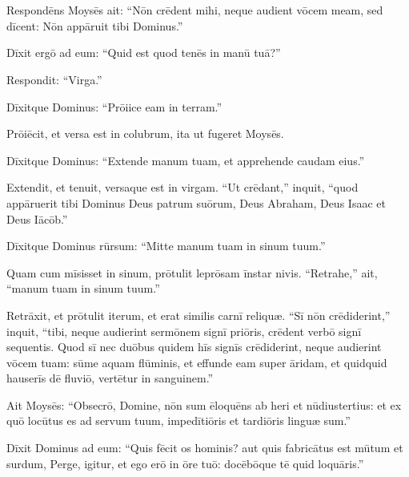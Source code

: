\chapter{}

\thispagestyle{empty}

\vspace*{-1.0cm}

Respondēns Moysēs ait: ``Nōn crēdent mihi, neque audient vōcem meam, sed dīcent:
Nōn appāruit tibi Dominus.''

Dīxit ergō ad eum: ``Quid est quod tenēs in manū tuā?''

Respondit: ``Virga.''

Dīxitque Dominus: ``Prōiice eam in terram.''

Prōiēcit, et versa est in colubrum, ita ut fugeret Moysēs. 

Dīxitque Dominus: ``Extende manum tuam, et apprehende caudam eius.''

Extendit, et tenuit, versaque est in virgam.
``Ut crēdant,'' inquit, ``quod appāruerit tibi Dominus Deus patrum suōrum,
Deus Abraham, Deus Isaac et Deus Iācōb.''

Dīxitque Dominus rūrsum: ``Mitte manum tuam in sinum tuum.''

Quam cum mīsisset in sinum, prōtulit leprōsam īnstar nivis.
 ``Retrahe,'' ait, ``manum tuam in sinum tuum.''

Retrāxit, et prōtulit iterum,
et erat similis carnī reliquæ.
``Sī nōn crēdiderint,'' inquit, ``tibi, neque audierint
sermōnem signī priōris, crēdent verbō signī sequentis. 
Quod sī nec duōbus quidem hīs signīs crēdiderint,
neque audierint vōcem tuam: sūme aquam flūminis,
et effunde eam super āridam, et quidquid hauserīs dē fluviō,
vertētur in sanguinem.''


Ait Moysēs: ``Obsecrō, Domine, nōn sum ēloquēns ab heri et
nūdiustertius: et ex quō locūtus es ad servum tuum,
impedītiōris et tardiōris linguæ sum.''

Dīxit Dominus ad eum: ``Quis fēcit os hominis?
aut quis fabricātus est mūtum et surdum,
Perge, igitur, et ego erō in ōre tuō:
docēbōque tē quid loquāris.''

